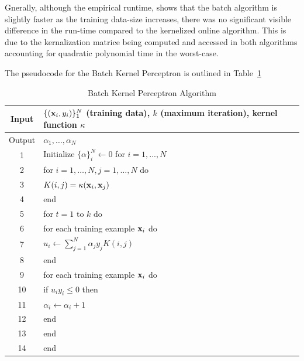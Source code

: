 \documentclass{article}
\def\x{{\bf x}}
\begin{document}
{Gnerally, although the empirical runtime, shows that the batch algorithm is slightly faster as the training data-size increases, there was no significant visible difference in the run-time compared to the kernelized online algorithm. This is due to the kernalization matrice being computed and accessed in both algorithms accounting for quadratic polynomial time in the worst-case.

The pseudocode for the Batch Kernel Perceptron is outlined in Table~\ref{tab2clast}
\begin{table}[!th]
	\centering
	\caption{Batch Kernel Perceptron Algorithm}
	\begin{tabular}{|c|l|}
		\hline
		Input & $\{(\x_i,y_i)\}_{1}^{N}$ (training data), $k$ (maximum iteration), kernel function $\kappa$\\ \hline 
    Output & $\alpha_1, \dots, \alpha_N$ \\ \hline\hline
	  1 & Initialize ${\{\alpha\}}_i^N \leftarrow 0$ for $i = 1,...,N$ \\\hline
    2 & for $i = 1,\dots,N, j = 1,\dots,N$ do\\
    3 & $K(i,j) = \kappa(\x_i,\x_j )$ \\
    4 & end\\
    5 & for $ t = 1$ to $k$ do\\
    6 & for each training example $\x_i$ do\\
    7 & $u_i \leftarrow \sum_{j=1}^N \alpha_j y_j K(i,j)$\\
    8 & end\\\hline
    9 & for each training example $\x_i$ do\\
    10 & if $ u_i y_i \le 0$ then\\
    11 & $\alpha_i \leftarrow  \alpha_i  + 1$\\
    12 & end\\
    13 & end\\
    14 & end\\\hline
	\end{tabular}
  \label{tab2clast}
\end{table}


}
\end{document}
